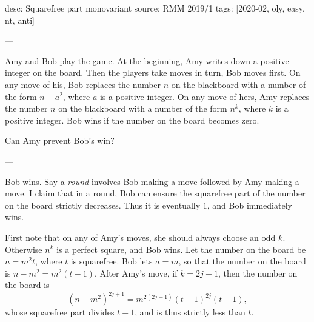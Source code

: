 desc: Squarefree part monovariant
source: RMM 2019/1
tags: [2020-02, oly, easy, nt, anti]

---

Amy and Bob play the game. At the beginning, Amy writes down a positive integer on the board. Then the players take moves in turn, Bob moves first. On any move of his, Bob replaces the number $n$ on the blackboard with a number of the form $n-a^2$, where $a$ is a positive integer. On any move of hers, Amy replaces the number $n$ on the blackboard with a number of the form $n^k$, where $k$ is a positive integer. Bob wins if the number on the board becomes zero.

Can Amy prevent Bob’s win?

---

Bob wins. Say a \emph{round} involves Bob making a move followed by Amy making a move. I claim that in a round, Bob can ensure the squarefree part of the number on the board strictly decreases. Thus it is eventually $1$, and Bob immediately wins.

First note that on any of Amy's moves, she should always choose an odd $k$. Otherwise $n^k$ is a perfect square, and Bob wins. Let the number on the board be $n=m^2t$, where $t$ is squarefree. Bob lets $a=m$, so that the number on the board is $n-m^2=m^2(t-1)$. After Amy's move, if $k=2j+1$, then the number on the board is \[\left(n-m^2\right)^{2j+1}=m^{2(2j+1)}(t-1)^{2j}(t-1),\]
whose squarefree part divides $t-1$, and is thus strictly less than $t$.
